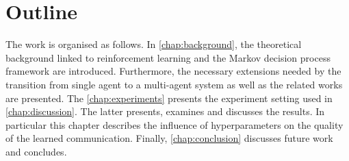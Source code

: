 \section{Outline}
The work is organised as follows. In \autoref{chap:background}, the theoretical background linked to reinforcement learning and the Markov decision process framework are introduced. Furthermore, the necessary extensions needed by the transition from single agent to a multi-agent system as well as the related works are presented. The \autoref{chap:experiments} presents the experiment setting used in \autoref{chap:discussion}. The latter presents, examines and discusses the results. In particular this chapter describes the influence of hyperparameters on the quality of the learned communication. Finally, \autoref{chap:conclusion} discusses future work and concludes.